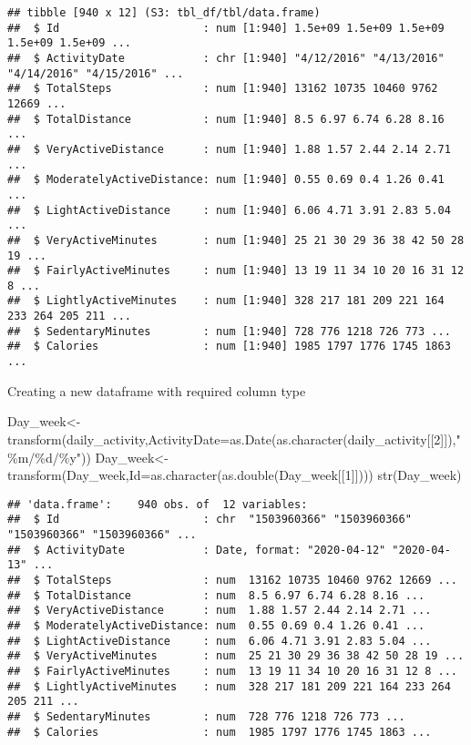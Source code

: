 \documentclass[
]{article}
\newenvironment{Shaded}{\begin{snugshade}}{\end{snugshade}}
\newcommand{\AttributeTok}[1]{\textcolor[rgb]{0.77,0.63,0.00}{#1}}
\newcommand{\DecValTok}[1]{\textcolor[rgb]{0.00,0.00,0.81}{#1}}
\newcommand{\FunctionTok}[1]{\textcolor[rgb]{0.00,0.00,0.00}{#1}}
\newcommand{\NormalTok}[1]{#1}
\newcommand{\OtherTok}[1]{\textcolor[rgb]{0.56,0.35,0.01}{#1}}
\newcommand{\StringTok}[1]{\textcolor[rgb]{0.31,0.60,0.02}{#1}}
\begin{document}
\begin{verbatim}
## tibble [940 x 12] (S3: tbl_df/tbl/data.frame)
##  $ Id                      : num [1:940] 1.5e+09 1.5e+09 1.5e+09 1.5e+09 1.5e+09 ...
##  $ ActivityDate            : chr [1:940] "4/12/2016" "4/13/2016" "4/14/2016" "4/15/2016" ...
##  $ TotalSteps              : num [1:940] 13162 10735 10460 9762 12669 ...
##  $ TotalDistance           : num [1:940] 8.5 6.97 6.74 6.28 8.16 ...
##  $ VeryActiveDistance      : num [1:940] 1.88 1.57 2.44 2.14 2.71 ...
##  $ ModeratelyActiveDistance: num [1:940] 0.55 0.69 0.4 1.26 0.41 ...
##  $ LightActiveDistance     : num [1:940] 6.06 4.71 3.91 2.83 5.04 ...
##  $ VeryActiveMinutes       : num [1:940] 25 21 30 29 36 38 42 50 28 19 ...
##  $ FairlyActiveMinutes     : num [1:940] 13 19 11 34 10 20 16 31 12 8 ...
##  $ LightlyActiveMinutes    : num [1:940] 328 217 181 209 221 164 233 264 205 211 ...
##  $ SedentaryMinutes        : num [1:940] 728 776 1218 726 773 ...
##  $ Calories                : num [1:940] 1985 1797 1776 1745 1863 ...
\end{verbatim}

Creating a new dataframe with required column type

\begin{Shaded}
\begin{Highlighting}[]
\NormalTok{Day\_week}\OtherTok{\textless{}{-}}\FunctionTok{transform}\NormalTok{(daily\_activity,}\AttributeTok{ActivityDate=}\FunctionTok{as.Date}\NormalTok{(}\FunctionTok{as.character}\NormalTok{(daily\_activity[[}\DecValTok{2}\NormalTok{]]),}\StringTok{"\%m/\%d/\%y"}\NormalTok{))}
\NormalTok{Day\_week}\OtherTok{\textless{}{-}}\FunctionTok{transform}\NormalTok{(Day\_week,}\AttributeTok{Id=}\FunctionTok{as.character}\NormalTok{(}\FunctionTok{as.double}\NormalTok{(Day\_week[[}\DecValTok{1}\NormalTok{]])))}
\FunctionTok{str}\NormalTok{(Day\_week)}
\end{Highlighting}
\end{Shaded}

\begin{verbatim}
## 'data.frame':    940 obs. of  12 variables:
##  $ Id                      : chr  "1503960366" "1503960366" "1503960366" "1503960366" ...
##  $ ActivityDate            : Date, format: "2020-04-12" "2020-04-13" ...
##  $ TotalSteps              : num  13162 10735 10460 9762 12669 ...
##  $ TotalDistance           : num  8.5 6.97 6.74 6.28 8.16 ...
##  $ VeryActiveDistance      : num  1.88 1.57 2.44 2.14 2.71 ...
##  $ ModeratelyActiveDistance: num  0.55 0.69 0.4 1.26 0.41 ...
##  $ LightActiveDistance     : num  6.06 4.71 3.91 2.83 5.04 ...
##  $ VeryActiveMinutes       : num  25 21 30 29 36 38 42 50 28 19 ...
##  $ FairlyActiveMinutes     : num  13 19 11 34 10 20 16 31 12 8 ...
##  $ LightlyActiveMinutes    : num  328 217 181 209 221 164 233 264 205 211 ...
##  $ SedentaryMinutes        : num  728 776 1218 726 773 ...
##  $ Calories                : num  1985 1797 1776 1745 1863 ...
\end{verbatim}
\end{document}

